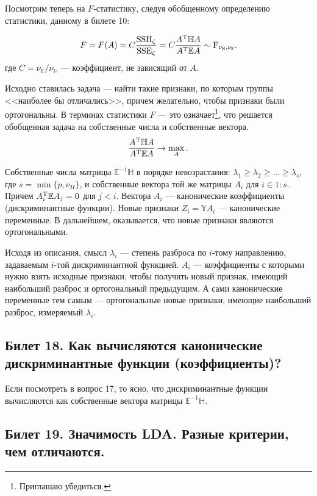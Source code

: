 Посмотрим теперь на $F$-статистику, следуя обобщенному определению статистики, данному в билете 10:

\begin{gather*}
    F = F(A) = C \frac{\mathrm{SSH}_\zeta}{\mathrm{SSE_\zeta}} = C \frac{A^{\mathrm{T}} \mathbb H A}{A^{\mathrm{T}} \mathbb E A} \sim
    \mathrm F_{\nu_\mathbb H, \nu_\mathbb E}.
\end{gather*}
где $C = \nu_\mathbb E / \nu_\mathbb H$ --- коэффициент, не зависящий от $A$.

Исходно ставилась задача --- найти такие признаки, по которым группы <<наиболее бы отличались>>, причем желательно, чтобы признаки были ортогональны.
В терминах статистики $F$ --- это означает\footnote{Приглашаю убедиться.}, что решается обобщенная задача на собственные числа и собственные вектора. 
\begin{gather*}
    \frac{A^{\mathrm{T}} \mathbb H A}{A^{\mathrm{T}} \mathbb E A} \rightarrow \max_A.
\end{gather*}

Собственные числа матрицы $\mathbb E^{-1} \mathbb H$ в порядке невозрастания: $\lambda_1 \geqslant \lambda_2 \geqslant \ldots
\geqslant \lambda_s$, где $s = \min\{p, \nu_H\}$, и собственные вектора той же матрицы $A_i$ для $i \in 1:s$.
Причем $A_i^{\mathrm{T}} \mathbb E A_j = 0$ для $j < i$.
Вектора $A_i$ --- канонические коэффициенты (дискриминантные функции). Новые признаки $Z_i = \mathbb Y A_i$ --- канонические переменные.
В дальнейшем, оказывается, что новые признаки являются ортогональными.

Исходя из описания, смысл $\lambda_i$ --- степень разброса по $i$-тому направлению, задаваемым $i$-той дискриминантной функцией.
$A_i$ --- коэффициенты с которыми нужно взять исходные признаки, чтобы получить новый признак, имеющий наибольший разброс и ортогональный
предыдущим. А сами канонические переменные тем самым --- ортогональные новые признаки, имеющие наибольший разброс, измеряемый $\lambda_i$.

\subsection{Билет 18. Как вычисляются канонические дискриминантные функции (коэффициенты)?}

Если посмотреть в вопрос 17, то ясно, что дискриминантные функции вычисляются как собственные вектора матрицы $\mathbb E^{-1} \mathbb H$.

\subsection{Билет 19. Значимость LDA. Разные критерии, чем отличаются.}

